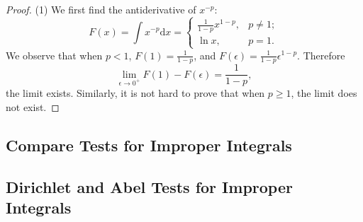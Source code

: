 \begin{proof}
  (1) We first find the antiderivative of $x^{-p}$:
  \begin{equation}
    F(x) = \int x^{-p}\mathrm{d} x =
    \begin{cases}
      \frac{1}{1-p} x^{1-p}, & p \neq 1;\\
      \ln x, & p =1.
    \end{cases}
  \end{equation}
  We observe that when $p < 1$, $F(1) = \frac{1}{1-p}$, and $F(\epsilon) =
  \frac{1}{1-p} \epsilon^{1-p}$. Therefore
  \begin{equation}
    \lim \limits _{\epsilon \rightarrow 0^+} F(1) - F(\epsilon) = \frac{1}{1-p},
  \end{equation}
  the limit exists. Similarly, it is not hard to prove that when $p \geq 1$, the
  limit does not exist.
\end{proof}

\subsection{Compare Tests for Improper Integrals}


\subsection{Dirichlet and Abel Tests for Improper Integrals}



